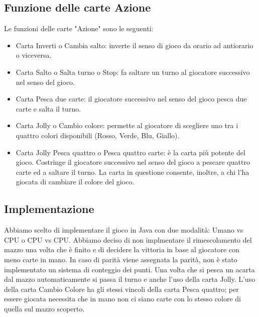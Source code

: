 		\subsection{Funzione delle carte Azione}
			Le funzioni delle carte "Azione" sono le seguenti:
			\begin{itemize}
			\item	Carta Inverti o Cambia salto: inverte il senso di gioco da orario ad antiorario o viceversa.
			\item	Carta Salto o Salta turno o Stop: fa saltare un turno al giocatore successivo nel senso del gioco.
			\item	Carta Pesca due carte: il giocatore successivo nel senso del gioco pesca due carte e salta il turno.
			\item	Carta Jolly o Cambio colore: permette al giocatore di scegliere uno tra i quattro colori disponibili (Rosso, Verde, Blu, Giallo).
			\item	Carta Jolly Pesca quattro o Pesca quattro carte: è la carta più potente del gioco. Costringe il giocatore successivo nel senso del gioco a pescare quattro carte ed a saltare il turno. La carta in questione consente, inoltre, a chi l'ha giocata di cambiare il colore del gioco.
			\end{itemize}
			
		\subsection{Implementazione}	
			Abbiamo scelto di implementare il gioco in Java con due modalità: Umano vs CPU o CPU vs CPU. Abbiamo deciso di non implmentare il rimescolamento del mazzo una volta che è finito e di decidere la vittoria in base al giocatore con meno carte in mano. In caso di parità viene assegnata la parità, non è stato implementato un sistema di conteggio dei punti. Una volta che si pesca un acarta dal mazzo automaticamente si passa il turno e anche l'uso della carta Jolly. L'uso della carta Cambio Colore ha gli stessi vincoli della carta Pesca quattro; per essere giocata necessita che in mano non ci siano carte con lo stesso colore di quella sul mazzo scoperto.
			
